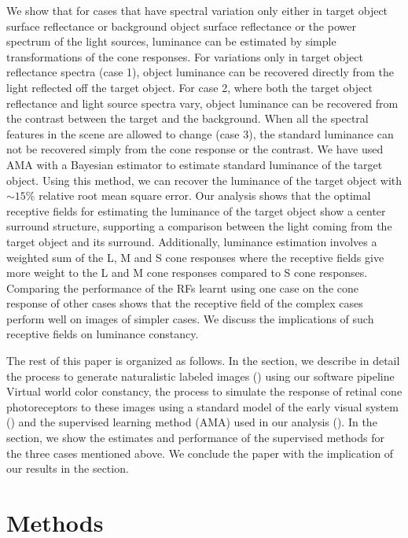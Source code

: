 \documentclass{jov}
\begin{document}
We show that for cases that have spectral variation only either in target object surface reflectance or background object surface reflectance or the power spectrum of the light sources, luminance can be estimated by simple transformations of the cone responses. For variations only in target object reflectance spectra (case 1), object luminance can be recovered directly from the light reflected off the target object. For case 2, where both the target object reflectance and light source spectra vary, object luminance can be recovered from the contrast between the target and the background. When all the spectral features in the scene are allowed to change (case 3), the standard luminance can not be recovered simply from the cone response or the contrast. We have used AMA with a Bayesian estimator to estimate standard luminance of the target object. Using this method, we can recover the luminance of the target object with $\sim 15\%$ relative root mean square error.  Our analysis shows that the optimal receptive fields for estimating the luminance of the target object show a center surround structure, supporting a comparison between the light coming from the target object and its surround. Additionally, luminance estimation involves a weighted sum of the L, M and S cone responses where the receptive fields give more weight to the L and M cone responses compared to S cone responses. Comparing the performance of the RFs learnt using  one case on the cone response of other cases shows that the receptive field of the complex cases perform well on images of simpler cases. We discuss the implications of such receptive fields on luminance constancy. 

The rest of this paper is organized as follows. In the  section, we describe in detail the process to generate naturalistic labeled images () using our software pipeline {\rm Virtual world color constancy}, the process to simulate the response of retinal cone photoreceptors to these images using a standard model of the early visual system () and the supervised learning method (AMA) used in our analysis (). In the  section, we show the estimates and performance of the supervised methods for the three cases mentioned above. We conclude the paper with the implication of our results in the  section.  

\section*{Methods} \label{Methods}
\end{document}
